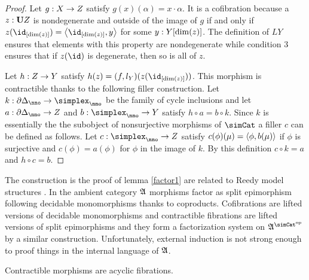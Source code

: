 \documentclass[csh.tex]{subfiles}
\begin{document}
\begin{proof}
Let $g: X\to Z$ satisfy $g(x)(\alpha) = x\cdot\alpha$. It is a cofibration because a $z:\mathbf{U} Z$ is nondegenerate and outside of the image of $g$ if and only if $z(\id_{[\dim(z)]}) = \tuplet{\id_{[\dim(z)]},y}$ for some $y: Y[\dim(z)]$. The definition of $LY$ ensures that elements with this property are nondegenerate while condition 3 ensures that if $z(\id)$ is degenerate, then so is all of $z$.

Let $h: Z\to Y$ satisfy $h(z) = (f,l_Y)(z(\id_{[\dim(z)]}))$. This morphism is contractible thanks to the following filler construction.
Let $k\of\cycle_\nno\to\simplex_\nno$ be the family of cycle inclusions and let $a\of \cycle_\nno\to Z$ and $b\of \simplex_\nno\to Y$ satisfy $h\circ a = b\circ k$. Since $k$ is essentially the the subobject of nonsurjective morphisms of $\simCat$ a filler $c$ can be defined as follows.
Let $c\of \simplex_\nno\to Z$ satisfy $c(\phi)(\mu) = \left\langle \phi,b(\mu) \right\rangle$ if $\phi$ is surjective and $c(\phi) = a(\phi)$ for $\phi$ in the image of $k$. By this definition $c\circ k = a$ and $h\circ c = b$.\end{proof}

\begin{remark} The construction is the proof of lemma \ref{factor1} are related to Reedy model structures \citep{Reedy74}. In the ambient category $\mathfrak A$ morphisms factor as split epimorphism following decidable monomorphisms thanks to coproducts. Cofibrations are lifted versions of decidable monomorphisms and contractible fibrations are lifted versions of split epimorphisms and they form a factorization system on $\ambient\s$ by a similar construction. Unfortunately, external induction is not strong enough to proof things in the internal language of $\mathfrak A$.
\end{remark}

\begin{lemma} Contractible morphisms are acyclic fibrations.\label{Reedy}\end{lemma}
\end{document}
